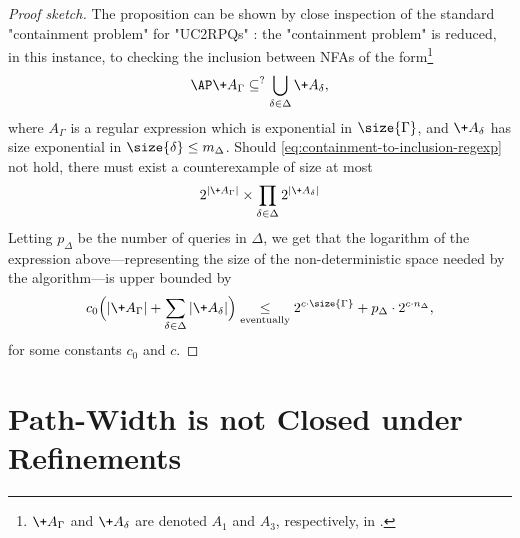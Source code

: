 \begin{proof}[Proof sketch]
    The proposition can be shown by close inspection of the standard "containment problem" for "UC2RPQs" \cite[Theorem 5]{CGLV00}: the "containment problem" is reduced, in this instance, to checking the inclusion between NFAs of the form\footnote{$\+A_\Gamma$ and $\+A_\delta$ are denoted $A_1$ and $A_3$, respectively, in \cite{CGLV00}.}
	\begin{equation}
		\AP\label{eq:containment-to-inclusion-regexp}
		\+A_\Gamma \subseteq^? \bigcup_{\delta \in \Delta} \+A_\delta,
	\end{equation}
	where $A_\Gamma$ is a regular expression which is exponential in $\size{\Gamma}$,
	and $\+A_\delta$ has size exponential in $\size{\delta} \leq m_\Delta$.
	Should \eqref{eq:containment-to-inclusion-regexp} not hold, there must exist a counterexample of size at most 
	\[
		2^{|\+A_\Gamma|}\times \prod_{\delta \in \Delta} 2^{|\+A_\delta|}
	\]
	Letting $p_\Delta$ be the number
	of queries in $\Delta$, we get that the logarithm of the expression above---representing the
	size of the non-deterministic space needed by the algorithm---is upper bounded by
	\[
		c_0 \Bigl(|\+A_\Gamma| + \sum_{\delta \in \Delta} |\+A_\delta|\Bigr)
		\mathrel{\underset{\tiny\textrm{eventually}}{\leq}}
		2^{c\cdot \size{\Gamma}} + p_{\Delta} \cdot 2^{c\cdot n_\Delta},
	\]
	for some constants $c_0$ and $c$.
\end{proof}

\section{\AP{}Path-Width is not Closed under Refinements}
\label{apdx-sec:path-width-not-closed-refinements}

\pathwidthnotclosed*


